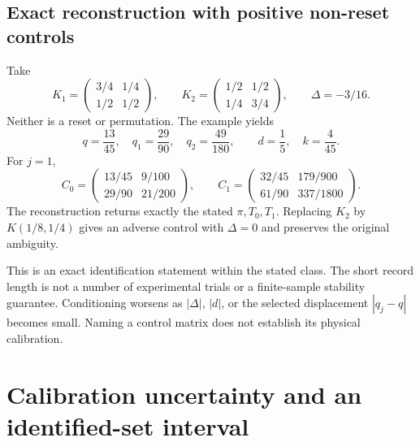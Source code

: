 \documentclass[11pt,letterpaper]{article}
\begin{document}
\subsection{Exact reconstruction with positive non-reset controls}

Take
\[
 K_1=\begin{pmatrix}3/4&1/4\\1/2&1/2\end{pmatrix},\qquad
 K_2=\begin{pmatrix}1/2&1/2\\1/4&3/4\end{pmatrix},\qquad\Delta=-3/16.
\]
Neither is a reset or permutation. The example yields
\[
 q=\frac{13}{45},\quad q_1=\frac{29}{90},\quad q_2=\frac{49}{180},
 \qquad d=\frac15,\quad k=\frac4{45}.
\]
For $j=1$,
\[
 C_0=\begin{pmatrix}13/45&9/100\\29/90&21/200\end{pmatrix},\qquad
 C_1=\begin{pmatrix}32/45&179/900\\61/90&337/1800\end{pmatrix}.
\]
The reconstruction returns exactly the stated $\pi,T_0,T_1$. Replacing $K_2$ by $K(1/8,1/4)$ gives an adverse control with $\Delta=0$ and preserves the original ambiguity.

This is an exact identification statement within the stated class. The short record length is not a number of experimental trials or a finite-sample stability guarantee. Conditioning worsens as $|\Delta|$, $|d|$, or the selected displacement $|q_j-q|$ becomes small. Naming a control matrix does not establish its physical calibration.



\section{Calibration uncertainty and an identified-set interval}
\end{document}
